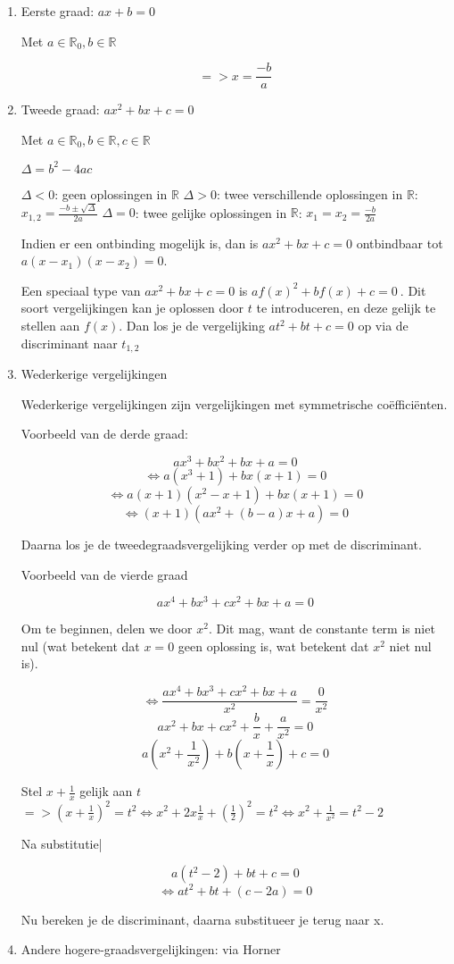 \begin{enumerate}
	\item Eerste graad: \(ax + b = 0\)
	
	Met \(a \in \mathbb{R}_0, b \in \mathbb{R} \)
	
	\[=> x = \frac{-b}{a} \]
	
	\item Tweede graad: \(ax^2 + bx + c = 0\)
	
	Met \( a \in \mathbb{R}_0, b \in \mathbb{R}, c \in \mathbb{R} \)
	
	\( \Delta = b^2 - 4ac  \)
	
	\subitem \(\Delta < 0\): geen oplossingen in \(\mathbb{R}\)
	\subitem \(\Delta > 0\): twee verschillende oplossingen in \(\mathbb{R}\): \(x_{1,2} = \frac{-b \pm \sqrt{\Delta}}{2a} \)
	\subitem \(\Delta = 0\): twee gelijke oplossingen in \(\mathbb{R}\): \(x_1 = x_2 = \frac{-b}{2a}\)
	
	Indien er een ontbinding mogelijk is, dan is \( ax^2 + bx + c = 0 \) ontbindbaar tot \( a(x-x_1)(x-x_2) = 0\).
	
	Een speciaal type van \(ax^2 + bx + c = 0\) is \( af(x)^2 + bf(x) + c = 0\ \). Dit soort vergelijkingen kan je oplossen door \(t\) te introduceren, en deze gelijk te stellen aan \(f(x)\). Dan los je de vergelijking \( at^2 + bt + c = 0 \) op via de discriminant naar \(t_{1,2}\)
	
	\item Wederkerige vergelijkingen
	
	Wederkerige vergelijkingen zijn vergelijkingen met symmetrische coëfficiënten.
	
	\subitem Voorbeeld van de derde graad:
	
	\[ax^3 + bx^2 + bx + a = 0\]
	\[\iff a(x^3 + 1) + bx(x + 1) = 0\]
	\[\iff a(x+1)(x^2 - x + 1) + bx(x + 1) = 0 \]
	\[\iff (x+1)(ax^2 + (b-a)x + a) = 0 \]
	
	Daarna los je de tweedegraadsvergelijking verder op met de discriminant.
	
	\subitem Voorbeeld van de vierde graad
	
	\[ ax^4 + bx^3 + cx^2 + bx + a = 0 \]
	
	Om te beginnen, delen we door \(x^2\).	Dit mag, want de constante term is niet nul (wat betekent dat \(x=0\) geen oplossing is, wat betekent dat \(x^2\) niet nul is).
	
	\[ \iff \frac{ax^4 + bx^3 + cx^2 + bx + a}{x^2} = \frac{0}{x^2} \]
	\[ ax^2 + bx + cx^2 + \frac{b}{x} + \frac{a}{x^2} = 0 \]
	\[ a(x^2 + \frac{1}{x^2}) + b(x+\frac{1}{x}) + c = 0 \]
	
	Stel \( x + \frac{1}{x} \) gelijk aan \(t\)  \( => (x+\frac{1}{x})^2 = t^2  \iff x^2 + 2 x \frac{1}{x} + (\frac{1}{2})^2 = t^2 \iff x^2 + \frac{1}{x^2} = t^2 - 2 \)
	
	Na substitutie|
	
	\[ a(t^2 - 2) + bt + c = 0 \]
	\[ \iff at^2 + bt + (c - 2a) = 0 \]
	
	Nu bereken je de discriminant, daarna substitueer je terug naar x.
	
	\item Andere hogere-graadsvergelijkingen: via Horner

\end{enumerate}

